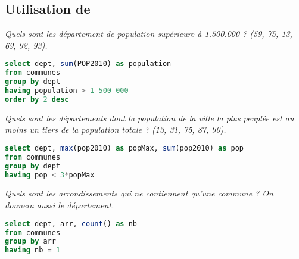\subsection{Utilisation de }
\begin{Exercise}
\it Quels sont les département de population supérieure à 1.500.000 ? (59, 75, 13, 69, 92, 93).
\end{Exercise}
\begin{Answer}
\begin{lstlisting}[language=SQL]
select dept, sum(POP2010) as population
from communes
group by dept
having population > 1 500 000
order by 2 desc
\end{lstlisting}
\newpage
\end{Answer}
\begin{Exercise}
\it Quels sont les départements dont la population de la ville la plus peuplée est au moins un tiers de la population totale ? (13, 31, 75, 87, 90).
\end{Exercise}
\begin{Answer}
\begin{lstlisting}[language=SQL]
select dept, max(pop2010) as popMax, sum(pop2010) as pop
from communes
group by dept
having pop < 3*popMax
\end{lstlisting}
\end{Answer}
\begin{Exercise}
\it Quels sont les arrondissements qui ne contiennent qu'une commune ? On donnera aussi le département.
\end{Exercise}
\begin{Answer}
\begin{lstlisting}[language=SQL]
select dept, arr, count() as nb
from communes
group by arr
having nb = 1
\end{lstlisting}
\end{Answer}
